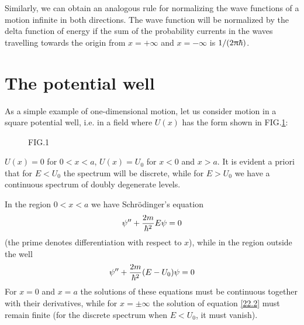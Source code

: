 Similarly, we can obtain an analogous rule for normalizing the wave functions of a motion infinite in both directions. The wave function will be normalized by the delta function of energy if the sum of the probability currents in the waves travelling towards the origin from $ x =+\infty $ and $ x = -\infty $ is $ 1/(2\uppi\hbar) $.
\section{The potential well}\label{The potential well}

As a simple example of one-dimensional motion, let us consider motion in a square potential well, i.e. in a field where $ U(x) $ has the form shown in FIG.\ref{Fig.1}:
\begin{wrapfigure}[11]{r}[0cm]{0cm}
	\caption{FIG.1}\label{Fig.1}
\end{wrapfigure}	
$ U (x) = 0 $ for $ 0 < x < a $, $ U (x) = U_0 $ for $ x < 0 $ and $ x > a $. It is evident a priori that for $ E < U_0 $ the spectrum will be discrete, while for $ E > U_0 $ we have a continuous spectrum of doubly degenerate levels.

In the region $ 0 < x < a $ we have Schr\"odinger's equation
\begin{equation}\label{22.1}
\psi''+\frac{2m}{\hbar^2}E\psi=0
\end{equation}
(the prime denotes differentiation with respect to $ x $), while in the region outside the well
\begin{equation}\label{22.2}
\psi''+\frac{2m}{\hbar^2}(E-U_0)\psi=0
\end{equation}
For $ x = 0 $ and $ x = a $ the solutions of these equations must be continuous together with their derivatives, while for $ x = \pm\infty $ the solution of equation \eqref{22.2} must remain finite (for the discrete spectrum when $ E < U_0 $, it must vanish).


